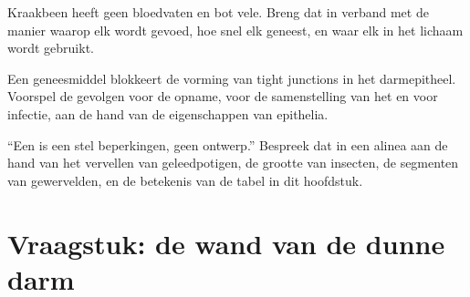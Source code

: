 \begin{exercise}[$\star\star\star$]\label{exo:b1:body-plans-tissues:10}
Kraakbeen heeft geen bloedvaten en bot vele. Breng dat in verband met de manier
waarop elk wordt gevoed, hoe snel elk geneest, en waar elk in het lichaam wordt
gebruikt.
\end{exercise}

\begin{exercise}[$\star\star\star$]\label{exo:b1:body-plans-tissues:11}
Een geneesmiddel blokkeert de vorming van tight junctions in het darmepitheel.
Voorspel de gevolgen voor de opname, voor de samenstelling van het 
en voor infectie, aan de hand van de eigenschappen van epithelia.
\end{exercise}

\begin{exercise}[$\star\star\star$]\label{exo:b1:body-plans-tissues:12}
``Een  is een stel beperkingen, geen ontwerp.'' Bespreek dat in een
alinea aan de hand van het vervellen van geleedpotigen, de grootte van insecten,
de segmenten van gewervelden, en de betekenis van de tabel in dit hoofdstuk.
\end{exercise}

\section{Vraagstuk: de wand van de dunne darm}

